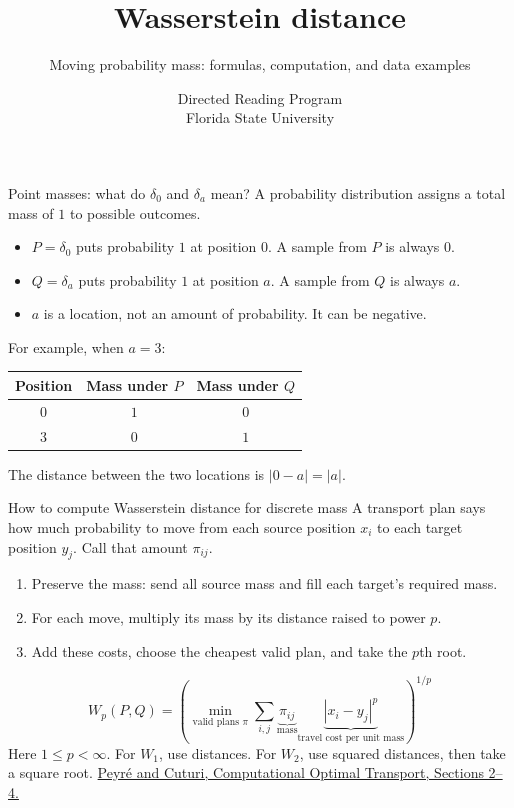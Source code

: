 \documentclass[aspectratio=169,11pt]{beamer}
\title{Wasserstein distance}
\subtitle{Moving probability mass: formulas, computation, and data examples}
\author{\texorpdfstring{Directed Reading Program\\Florida State University}{Directed Reading Program, Florida State University}}
\date{}
\newcommand{\src}[2]{\vfill{\tiny\color{gray}\href{#1}{#2}}}
\newcommand{\otref}{\src{https://arxiv.org/abs/1803.00567}{Peyr\'e and Cuturi, Computational Optimal Transport, Sections 2--4.}}
\begin{document}
\begin{frame}
\titlepage
\end{frame}

\begin{frame}{Point masses: what do $\delta_0$ and $\delta_a$ mean?}
A probability distribution assigns a total mass of $1$ to possible outcomes.
\vspace{3mm}
\begin{itemize}\setlength\itemsep{3mm}
\item $P=\delta_0$ puts probability $1$ at position $0$. A sample from $P$ is always $0$.
\item $Q=\delta_a$ puts probability $1$ at position $a$. A sample from $Q$ is always $a$.
\item $a$ is a location, not an amount of probability. It can be negative.
\end{itemize}
\vspace{3mm}
For example, when $a=3$:
\begin{center}
\begin{tabular}{c cc}
\toprule
Position & Mass under $P$ & Mass under $Q$\\\midrule
$0$ & $1$ & $0$\\
$3$ & $0$ & $1$\\\bottomrule
\end{tabular}
\end{center}
The distance between the two locations is $|0-a|=|a|$.
\end{frame}

\begin{frame}{How to compute Wasserstein distance for discrete mass}
A \alert{transport plan} says how much probability to move from each source
position $x_i$ to each target position $y_j$. Call that amount $\pi_{ij}$.
\vspace{2mm}
\begin{enumerate}\setlength\itemsep{2mm}
\item Preserve the mass: send all source mass and fill each target's required mass.
\item For each move, multiply its mass by its distance raised to power $p$.
\item Add these costs, choose the cheapest valid plan, and take the $p$th root.
\end{enumerate}
\[
\boxed{W_p(P,Q)=\left(\min_{\text{valid plans }\pi}
\sum_{i,j}\underbrace{\pi_{ij}}_{\text{mass}}
\underbrace{|x_i-y_j|^p}_{\text{travel cost per unit mass}}\right)^{1/p}}
\]
Here $1\leq p<\infty$. For $W_1$, use distances. For $W_2$, use squared
distances, then take a square root.
\otref
\end{frame}
\end{document}
